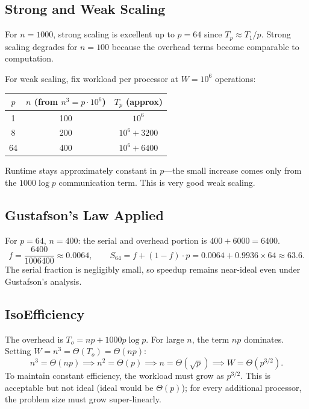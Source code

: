 \subsection{Strong and Weak Scaling}

For $n = 1000$, strong scaling is excellent up to $p = 64$ since $T_p \approx T_1/p$.
Strong scaling degrades for $n = 100$ because the overhead terms become comparable
to computation.

For weak scaling, fix workload per processor at $W = 10^6$ operations:

\begin{center}
\begin{tabular}{ccc}
\toprule
$p$ & $n$ (from $n^3 = p \cdot 10^6$) & $T_p$ (approx) \\
\midrule
1  & 100 & $10^6$ \\
8  & 200 & $10^6 + 3200$ \\
64 & 400 & $10^6 + 6400$ \\
\bottomrule
\end{tabular}
\end{center}

Runtime stays approximately constant in $p$---the small increase comes only from
the $1000 \log p$ communication term. This is very good weak scaling.

\subsection{Gustafson's Law Applied}

For $p = 64$, $n = 400$: the serial and overhead portion is $400 + 6000 = 6400$.
\[
  f = \frac{6400}{1006400} \approx 0.0064,
  \qquad
  S_{64} = f + (1-f) \cdot p = 0.0064 + 0.9936 \times 64 \approx 63.6.
\]
The serial fraction is negligibly small, so speedup remains near-ideal even
under Gustafson's analysis.

\subsection{IsoEfficiency}

The overhead is $T_o = np + 1000p \log p$. For large $n$, the term $np$
dominates. Setting $W = n^3 = \Theta(T_o) = \Theta(np)$:
\[
  n^3 = \Theta(np) \implies n^2 = \Theta(p) \implies n = \Theta(\sqrt{p})
  \implies W = \Theta(p^{3/2}).
\]
To maintain constant efficiency, the workload must grow as $p^{3/2}$. This is
acceptable but not ideal (ideal would be $\Theta(p)$); for every additional
processor, the problem size must grow super-linearly.

